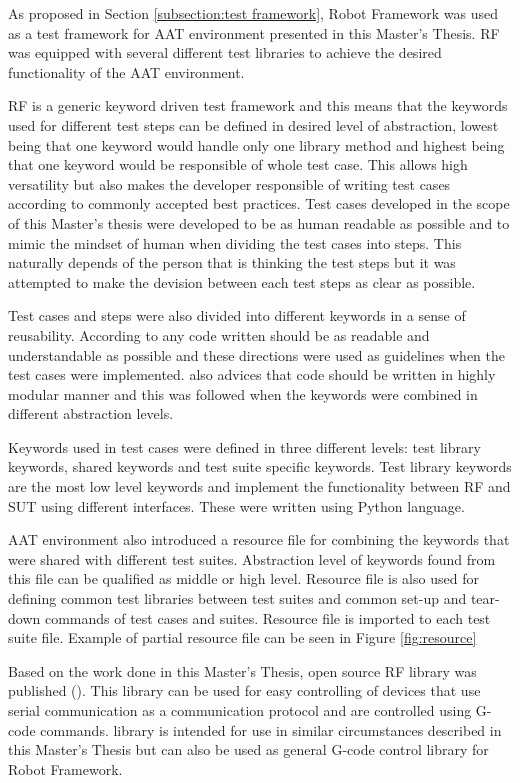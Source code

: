 As proposed in Section \ref{subsection:test framework}, Robot Framework was used as a test framework for AAT environment presented in this Master's Thesis. RF was equipped with several different test libraries to achieve the desired functionality of the AAT environment.

RF is a generic keyword driven test framework and this means that the keywords used for different test steps can be defined in desired level of abstraction, lowest being that one keyword would handle only one library method and highest being that one keyword would be responsible of whole test case. This allows high versatility but also makes the developer responsible of writing test cases according to commonly accepted best practices. Test cases developed in the scope of this Master's thesis were developed to be as human readable as possible and to mimic the mindset of human when dividing the test cases into steps. This naturally depends of the person that is thinking the test steps but it was attempted to make the devision between each test steps as clear as possible.

Test cases and steps were also divided into different keywords in a sense of reusability. According to \emph{\cite{clean-code}} any code written should be as readable and understandable as possible and these directions were used as guidelines when the test cases were implemented. \emph{\cite{clean-code}} also advices that code should be written in highly modular manner and this was followed when the keywords were combined in different abstraction levels.

Keywords used in test cases were defined in three different levels: test library keywords, shared keywords and test suite specific keywords. Test library keywords are the most low level keywords and implement the functionality between RF and SUT using different interfaces. These were written using Python language. 

AAT environment also introduced a resource file for combining the keywords that were shared with different test suites. Abstraction level of keywords found from this file can be qualified as middle or high level. Resource file is also used for defining common test libraries between test suites and common set-up and tear-down commands of test cases and suites. Resource file is imported to each test suite file. Example of partial resource file can be seen in Figure \ref{fig:resource}

Based on the work done in this Master's Thesis, open source RF library was published (\emph{\cite{cnc-library}}). This library can be used for easy controlling of devices that use serial communication as a communication protocol and are controlled using G-code commands. library is intended for use in similar circumstances described in this Master's Thesis but can also be used as general G-code control library for Robot Framework.

